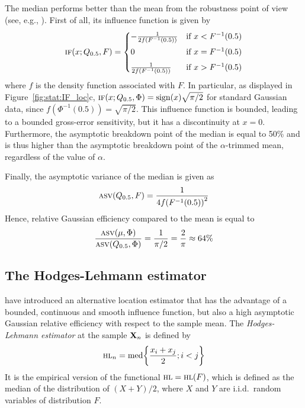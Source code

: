 The median performs better than the mean from the robustness point of view
(see, e.g., \citealp[p.\ 56 and 59]{staudte:sheather:1990}). First of all, its
influence function is given by
\[
    \stsc{IF}(x; Q_{0.5}, F) =
    \begin{cases}
        -\frac{1}{2f\left(F^{-1}(0.5)\right)} & \text{if $x < F^{-1}(0.5)$}\\[1ex]
        0                                     & \text{if $x = F^{-1}(0.5)$}\\[1ex]
        \frac{1}{2 f\left(F^{-1}(0.5)\right)} & \text{if $x > F^{-1}(0.5)$}
    \end{cases}
\]
where $f$ is the density function associated with $F$. In particular, as
displayed in Figure~\ref{fig:stat:IF_loc}c, $\stsc{IF}(x; Q_{0.5}, \Phi) =
\sign(x) \sqrt{\pi/2}$ for standard Gaussian data, since $f\left(\Phi^{-1}(0.5)\right) = \sqrt{\pi/2}$. This
influence function is bounded, leading to a bounded gross-error sensitivity, but
it has a discontinuity at $x = 0$.                                              
Furthermore, the asymptotic breakdown point of
the median is equal to 50\% and is thus higher than the asymptotic breakdown
point of the $\alpha$-trimmed mean, regardless of the value of $\alpha$.

Finally, the asymptotic variance of the median is given as
\[
    \stsc{ASV}(Q_{0.5}, F) = \frac{1}{4 f\left(F^{-1}(0.5)\right)^2}
\]
Hence, relative Gaussian efficiency compared to the mean is
equal to 
\[
    \frac{\stsc{ASV}(\mu, \Phi)}{\stsc{ASV}(Q_{0.5}, \Phi)} 
    = \frac{1}{\pi/2} = \frac{2}{\pi} \approx 64\%
\]

\subsection{The Hodges-Lehmann estimator}

\citet{hodges:lehmann:1963} have introduced an alternative location estimator
that has the advantage of a bounded, continuous and smooth influence
function, but also a high asymptotic Gaussian relative efficiency with respect
to the sample mean. The \emph{Hodges-Lehmann estimator} at the sample 
$\mathbf X_n$ is defined by                                                    
\[
    \stsc{HL}_n = \med\left\{\frac{x_i+x_j}{2}; i<j \right\}
\]
It is the empirical version of the functional $\stsc{HL} = \stsc{HL}(F)$,
which is defined as the median of the distribution of $(X+Y)/2$, where $X$ and
$Y$ are i.i.d.\ random variables of distribution $F$.

